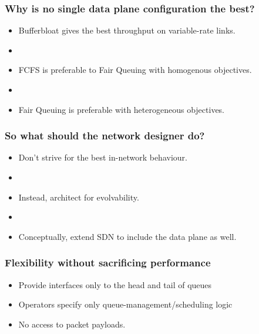 \begin{Large}
\begin{frame}[plain]
\frametitle{Why is no single data plane configuration the best?}
\begin{itemize}
\item Bufferbloat gives the best throughput on variable-rate links.
\item[] 

\item FCFS is preferable to Fair Queuing with homogenous objectives.

\item[]

\item Fair Queuing is preferable with heterogeneous objectives.
\end{itemize}
\end{frame}

\begin{frame}[plain]
\frametitle{So what should the network designer do?}
\begin{itemize}
\item Don't strive for the best in-network behaviour.
\item []
\item Instead, architect for evolvability. 
\item []
\item Conceptually, extend SDN to include the data plane as well.
\end{itemize}
\end{frame}

\begin{frame}[plain]
\frametitle{Flexibility without sacrificing performance}


\begin{itemize}
\item Provide interfaces only to the head and tail of queues
\item Operators specify only queue-management/scheduling logic
\item No access to packet payloads.
\end{itemize}
\end{frame}


\end{Large}
